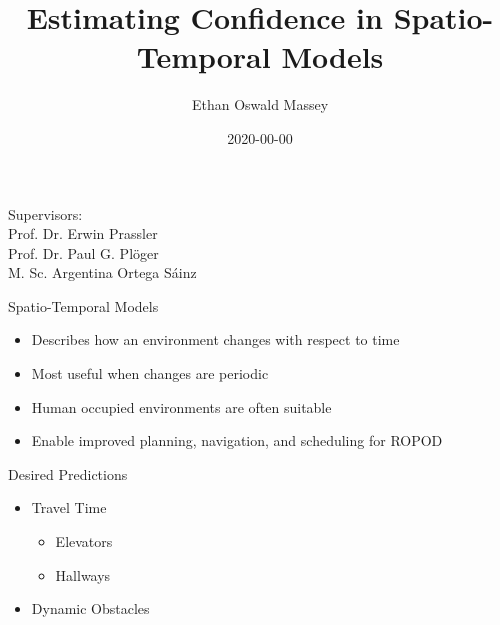 \documentclass{beamer}
\author[Ethan Oswald Massey]{Ethan Oswald Massey}
\title{Estimating Confidence in Spatio-Temporal Models}
\institute[HBRS]{Hochschule Bonn-Rhein-Sieg}
\date{2020-00-00}
\begin{document}
{
\begin{frame}
\titlepage
\vspace{5mm}

Supervisors: \\ Prof. Dr. Erwin Prassler  \\ Prof. Dr. Paul G. Pl\"{o}ger \\ M. Sc. Argentina Ortega S\'{a}inz
\end{frame}
}

\begin{frame}[t]{Spatio-Temporal Models}
  \begin{itemize}
    \setlength\itemsep{1em}
    \item Describes how an environment changes with respect to time
    \item Most useful when changes are periodic
    \item Human occupied environments are often suitable
    \item Enable improved planning, navigation, and scheduling for ROPOD
  \end{itemize}

  \begin{block}{Desired Predictions}
    \begin{itemize}
    \item Travel Time
      \begin{itemize}
        \item Elevators
        \item Hallways
      \end{itemize}
    \item Dynamic Obstacles
    \end{itemize}
  \end{block}
\end{frame}
\end{document}
